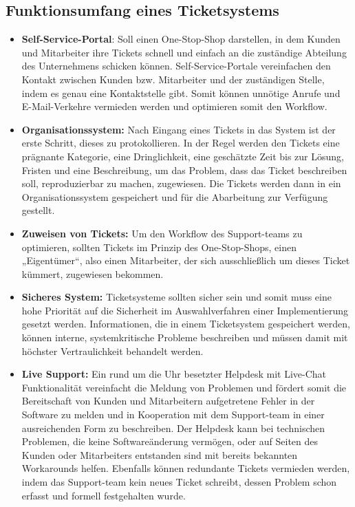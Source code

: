   \subsection{Funktionsumfang eines Ticketsystems}
  
  \begin{itemize}
	  \item 	\textbf{Self-Service-Portal}: Soll einen One-Stop-Shop darstellen, in dem Kunden und Mitarbeiter ihre Tickets schnell und einfach an die zuständige Abteilung des Unternehmens schicken können. Self-Service-Portale vereinfachen den Kontakt zwischen Kunden bzw. Mitarbeiter und der zuständigen Stelle, indem es genau eine Kontaktstelle gibt. Somit können unnötige Anrufe und E-Mail-Verkehre vermieden werden und optimieren somit den Workflow.  \\
	  \item \textbf{	Organisationssystem:} Nach Eingang eines Tickets in das System ist der erste Schritt, dieses zu protokollieren. In der Regel werden den Tickets eine prägnante Kategorie, eine Dringlichkeit, eine geschätzte Zeit bis zur Lösung, Fristen und eine Beschreibung, um das Problem, dass das Ticket beschreiben soll, reproduzierbar zu machen, zugewiesen. Die Tickets werden dann in ein Organisationssystem gespeichert und für die Abarbeitung zur Verfügung gestellt.  \\
	  \item \textbf{Zuweisen von Tickets:} Um den Workflow des Support-teams zu optimieren, sollten Tickets im Prinzip des One-Stop-Shops, einen „Eigentümer“, also einen Mitarbeiter, der sich ausschließlich um dieses Ticket kümmert, zugewiesen bekommen.
	  \item \textbf{	Sicheres System:} Ticketsysteme sollten sicher sein und somit muss eine hohe Priorität auf die Sicherheit im Auswahlverfahren einer Implementierung gesetzt werden. Informationen, die in einem Ticketsystem gespeichert werden, können interne, systemkritische Probleme beschreiben und müssen damit mit höchster Vertraulichkeit behandelt werden. \\
	  \item \textbf{Live Support:} Ein rund um die Uhr besetzter Helpdesk mit Live-Chat Funktionalität vereinfacht die Meldung von Problemen und fördert somit die Bereitschaft von Kunden und Mitarbeitern aufgetretene Fehler in der Software zu melden und in Kooperation mit dem Support-team in einer ausreichenden Form zu beschreiben. Der Helpdesk kann bei technischen Problemen, die keine Softwareänderung vermögen, oder auf Seiten des Kunden oder Mitarbeiters entstanden sind mit bereits bekannten Workarounds helfen. Ebenfalls können redundante Tickets vermieden werden, indem das Support-team kein neues Ticket schreibt, dessen Problem schon erfasst und formell festgehalten wurde. \\
  \end{itemize}
  
